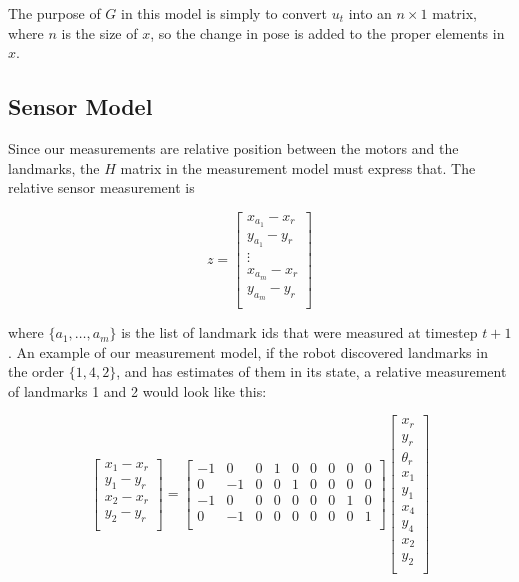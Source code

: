 \documentclass[prodmode,acmtecs]{acmsmall} %
\begin{document}
The purpose of $G$ in this model is simply to convert $u_t$ into an $n\times 1$ matrix, where $n$ is the size of $x$, so the change in pose is added to the proper elements in $x$.

\subsection{Sensor Model}

Since our measurements are relative position between the motors and the landmarks, the $H$ matrix in the measurement model must express that. The relative sensor measurement is

$$
z = 
\begin{bmatrix}
    x_{a_1} - x_r \\
    y_{a_1} - y_r \\
    \vdots\\
    x_{a_m} - x_r \\
    y_{a_m} - y_r \\
\end{bmatrix}
$$ 

where $\{a_1,\ldots,a_m\}$ is the list of landmark ids that were measured at timestep $t+1$. An example of our measurement model, if the robot discovered landmarks in the order $\{1,4,2\}$, and has estimates of them in its state, a relative measurement of landmarks 1 and 2 would look like this:

$$
\begin{bmatrix}
    x_1 - x_r \\
    y_1 - y_r \\
    x_2 - x_r \\
    y_2 - y_r \\
\end{bmatrix}
=
\begin{bmatrix}
    -1 & 0 & 0 & 1 & 0 & 0 & 0 & 0 & 0 \\
    0 & -1 & 0 & 0 & 1 & 0 & 0 & 0 & 0 \\
    -1 & 0 & 0 & 0 & 0 & 0 & 0 & 1 & 0 \\
    0 & -1 & 0 & 0 & 0 & 0 & 0 & 0 & 1 \\
\end{bmatrix}
\begin{bmatrix}
    x_r \\
    y_r \\
    \theta_r \\
    x_1 \\
    y_1 \\
    x_4 \\
    y_4 \\
    x_2 \\
    y_2 \\
\end{bmatrix}
$$
\end{document}
